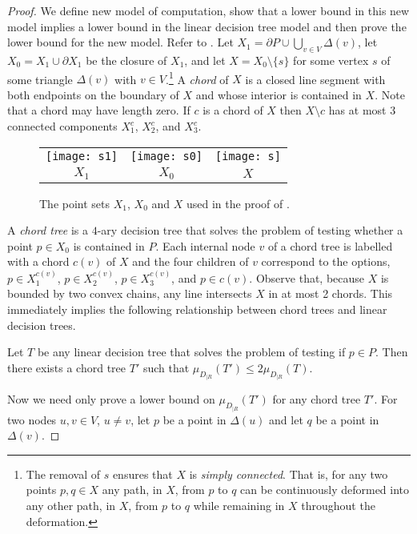 \documentclass[charterfonts,lotsofwhite]{patmorin}
\newcommand{\boundary}{\partial}
\begin{document}
\begin{proof}

We define new model of computation, show that a lower bound in this
new model implies a lower bound in the linear decision tree model and
then prove the lower bound for the new model.  Refer to .
Let $X_1= \boundary P \cup \bigcup_{v\in V} \Delta(v)$, let
$X_0=X_1\cup\boundary X_1$ be the closure of $X_1$, and let
$X=X_0\setminus\{s\}$ for some vertex $s$ of some triangle $\Delta(v)$
with $v\in V$.\footnote{The removal of $s$ ensures that $X$ is
\emph{simply connected}.  That is, for any two points $p,q\in X$ any
path, in $X$, from $p$ to $q$ can be continuously deformed into any
other path, in $X$, from $p$ to $q$ while remaining in $X$ throughout
the deformation.} A \emph{chord} of $X$ is a closed line segment with
both endpoints on the boundary of $X$ and whose interior is contained
in $X$. Note that a chord may have length zero.  If $c$ is a chord of
$X$ then $X\setminus c$ has at most 3 connected components $X^c_1$,
$X^c_2$, and $X^c_3$.

\begin{figure}
\begin{center}
\begin{tabular}{ccc}
\texttt{[image: s1]} &
\texttt{[image: s0]} &
\texttt{[image: s]} \\
$X_1$ & $X_0$ & $X$ 
\end{tabular}
\end{center}
\caption{The point sets $X_1$, $X_0$ and $X$ used in the proof of
.}
\end{figure}

A \emph{chord tree} is a $4$-ary decision tree that solves the problem
of testing whether a point $p\in X_0$ is contained in $P$.  Each
internal node $v$ of a chord tree is labelled with a chord $c(v)$ of
$X$ and the four children of $v$ correspond to the options,
$p\in X^{c(v)}_1$, $p\in X^{c(v)}_2$, $p\in X^{c(v)}_3$, and $p\in c(v)$.
Observe that, because $X$ is bounded by two convex chains, any line
intersects $X$ in at most 2 chords.  This immediately implies the
following relationship between chord trees and linear decision trees.
\begin{clm}
Let $T$ be any linear decision tree that solves the problem of testing
if $p\in P$.  Then there exists a chord tree $T'$ such that 
$\mu_{D_{|R}}(T') \le 2\mu_{D_{|R}}(T)$.
\end{clm}

Now we need only prove a lower bound on $\mu_{D_{|R}}(T')$ for any
chord tree $T'$.  For two nodes $u,v\in V$, $u\neq v$, let $p$ be a
point in $\Delta(u)$ and let $q$ be a point in $\Delta(v)$.  


\end{proof}
\end{document}
